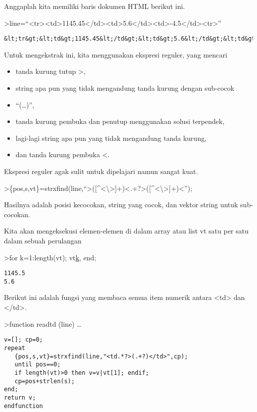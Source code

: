 \documentclass[
]{book}
\begin{document}
Anggaplah kita memiliki baris dokumen HTML berikut ini.

\textgreater line=``\textless tr\textgreater\textless td\textgreater1145.45\textless/td\textgreater\textless td\textgreater5.6\textless/td\textgreater\textless td\textgreater-4.5\textless/td\textgreater\textless tr\textgreater{}''

\begin{verbatim}
&lt;tr&gt;&lt;td&gt;1145.45&lt;/td&gt;&lt;td&gt;5.6&lt;/td&gt;&lt;td&gt;-4.5&lt;/td&gt;&lt;tr&gt;
\end{verbatim}

Untuk mengekstrak ini, kita menggunakan ekspresi reguler, yang mencari

\begin{itemize}
\item
  tanda kurung tutup \textgreater,
\item
  string apa pun yang tidak mengandung tanda kurung dengan sub-cocok
\item
  ``(\ldots)'',
\item
  tanda kurung pembuka dan penutup menggunakan solusi terpendek,
\item
  lagi-lagi string apa pun yang tidak mengandung tanda kurung,
\item
  dan tanda kurung pembuka \textless.
\end{itemize}

Ekspresi reguler agak sulit untuk dipelajari namun sangat kuat.

\textgreater\{pos,s,vt\}=strxfind(line,``\textgreater({[}\^{}\textless\textbackslash\textgreater{]}+)\textless.+?\textgreater({[}\^{}\textless\textbackslash\textgreater{]}+)\textless{}'');

Hasilnya adalah posisi kecocokan, string yang cocok, dan vektor string untuk sub-cocokan.

Kita akan mengeksekusi elemen-elemen di dalam array atau list vt satu per satu dalam sebuah perulangan

\textgreater for k=1:length(vt); vt\href{}{k}, end;

\begin{verbatim}
1145.5
5.6
\end{verbatim}

Berikut ini adalah fungsi yang membaca semua item numerik antara \textless td\textgreater{} dan \textless/td\textgreater.

\textgreater function readtd (line) \ldots{}

\begin{verbatim}
v=[]; cp=0;
repeat
   {pos,s,vt}=strxfind(line,"<td.*?>(.+?)</td>",cp);
   until pos==0;
   if length(vt)>0 then v=v|vt[1]; endif;
   cp=pos+strlen(s);
end;
return v;
endfunction
\end{verbatim}
\end{document}
